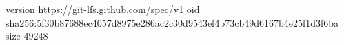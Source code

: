 version https://git-lfs.github.com/spec/v1
oid sha256:5f30b87688ec4057d8975e286ac2c30d9543ef4b73cb49d6167b4e25f1d3f6ba
size 49248
